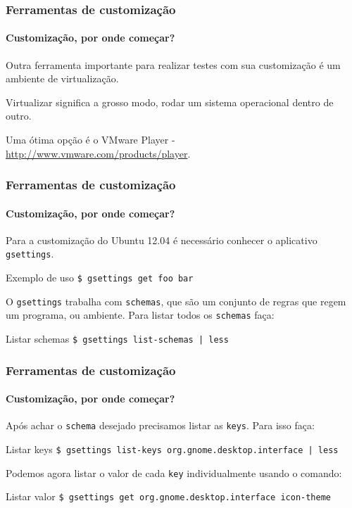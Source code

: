 \begin{frame}\frametitle{Ferramentas de customização}\framesubtitle{Customização, por onde começar?}

Outra ferramenta importante para realizar testes com sua customização é um ambiente de virtualização.

\medskip

Virtualizar significa a grosso modo, rodar um sistema operacional dentro de outro.

\medskip

Uma ótima opção é o VMware Player - \url{http://www.vmware.com/products/player}.

\end{frame}

\begin{frame}\frametitle{Ferramentas de customização}\framesubtitle{Customização, por onde começar?}

Para a customização do Ubuntu 12.04 é necessário conhecer o aplicativo \texttt{gsettings}.

\begin{block}{Exemplo de uso}
\texttt{\$ gsettings get foo bar}
\end{block}

\medskip

O \texttt{gsettings} trabalha com \texttt{schemas}, que são um conjunto de regras que regem um programa,
ou ambiente. Para listar todos os \texttt{schemas} faça:

\begin{block}{Listar schemas}
\texttt{\$ gsettings list-schemas | less}
\end{block}

\end{frame}

\begin{frame}\frametitle{Ferramentas de customização}\framesubtitle{Customização, por onde começar?}

Após achar o \texttt{schema} desejado precisamos listar as \texttt{keys}. Para isso faça:

\begin{block}{Listar keys}
\texttt{\$ gsettings list-keys org.gnome.desktop.interface | less}
\end{block}

\medskip

Podemos agora listar o valor de cada \texttt{key} individualmente usando o comando:

\begin{block}{Listar valor}
\texttt{\$ gsettings get org.gnome.desktop.interface icon-theme}
\end{block}

\end{frame}

